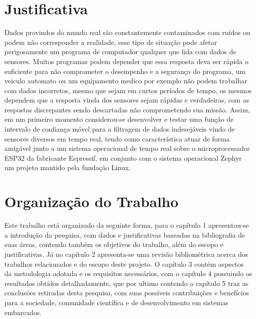\section{Justificativa}
Dados provindos do mundo real são constantemente contaminados com ruídos ou podem não corresponder a realidade, esse tipo de situação pode afetar perigosamente um programa de computador qualquer que lida com dados de sensores. Muitos programas podem depender que essa resposta deva ser rápida o suficiente para não comprometer o desempenho e a segurança do programa, um veiculo automato ou um equipamento medico por exemplo não podem trabalhar com dados incorretos, mesmo que sejam em curtos períodos de tempo, os mesmos dependem que a resposta vinda dos sensores sejam rápidas e verdadeiras, com as respostas discrepantes sendo descartadas não comprometendo sua missão. 
Assim, em um primeiro momento considerou-se desenvolver e testar uma função de intervalo de confiança móvel para a filtragem de dados indesejáveis vindo de sensores diversos em tempo real, tendo como característica atuar de forma amigável junto a um sistema operacional de tempo real sobre o microprocessador ESP32 da fabricante Espressif, em conjunto com o sistema operacional Zephyr um projeto mantido pela fundação Linux.


\section{Organização do Trabalho}
Este trabalho está organizado da seguinte forma, para o capítulo 1 apresentou-se a introdução da pesquisa, com dados e justificativas baseadas na bibliografia de suas áreas, contendo também os objetivos do trabalho, além do escopo e justificativas. Já no capítulo 2 apresenta-se uma revisão bibliométrica acerca dos trabalhos relacionados e do escopo deste projeto. O capítulo 3 contém aspectos da metodologia adotada e os requisitos necessários, com o  capítulo 4 
possuindo os resultados obtidos detalhadamente, que por ultimo contendo o capítulo 5 traz as conclusões retiradas desta pesquisa, com suas possíveis contribuições e benefícios para a sociedade, comunidade científica e de desenvolvimento em sistemas embarcados.

